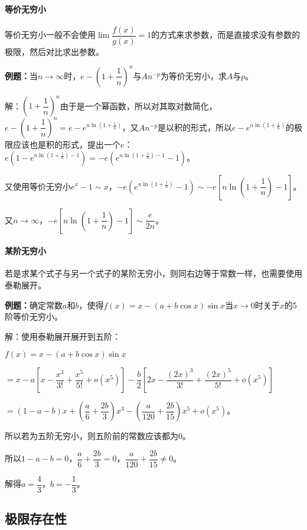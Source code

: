 \paragraph{等价无穷小} \leavevmode \medskip

等价无穷小一般不会使用$\lim\dfrac{f(x)}{g(x)}=1$的方式来求参数，而是直接求没有参数的极限，然后对比求出参数。

\textbf{例题：}当$n\to\infty$时，$e-\left(1+\dfrac{1}{n}\right)^n$与$An^{-p}$为等价无穷小，求$A$与$p$。

解：$\left(1+\dfrac{1}{n}\right)^n$由于是一个幂函数，所以对其取对数简化，$e-\left(1+\dfrac{1}{n}\right)^n=e-e^{n\ln(1+\frac{1}{n})}$，又$An^{-p}$是以积的形式，所以$e-e^{n\ln(1+\frac{1}{n})}$的极限应该也是积的形式，提出一个$e$：$e(1-e^{n\ln(1+\frac{1}{n})-1})=-e(e^{n\ln(1+\frac{1}{n})-1}-1)$。

又使用等价无穷小$e^x-1\sim x$，$-e(e^{n\ln(1+\frac{1}{n})}-1)\sim-e\left[n\ln\left(1+\dfrac{1}{n}\right)-1\right]$。

又$n\to\infty$，$-e\left[n\ln\left(1+\dfrac{1}{n}\right)-1\right]\sim\dfrac{e}{2n}$。

\paragraph{某阶无穷小} \leavevmode \medskip

若是求某个式子与另一个式子的某阶无穷小，则同右边等于常数一样，也需要使用泰勒展开。

\textbf{例题：}确定常数$a$和$b$，使得$f(x)=x-(a+b\cos x)\sin x$当$x\to 0$时关于$x$的5阶等价无穷小。

解：使用泰勒展开展开到五阶：

$f(x)=x-(a+b\cos x)\sin x$

$=x-a\left[x-\dfrac{x^3}{3!}+\dfrac{x^5}{5!}+o(x^5)\right]-\dfrac{b}{2}\left[2x-\dfrac{(2x)^3}{3!}+\dfrac{(2x)^5}{5!}+o(x^5)\right]$

$=(1-a-b)x+\left(\dfrac{a}{6}+\dfrac{2b}{3}\right)x^3-\left(\dfrac{a}{120}+\dfrac{2b}{15}\right)x^5+o(x^5)$。\medskip

所以若为五阶无穷小，则五阶前的常数应该都为0。

所以$1-a-b=0$，$\dfrac{a}{6}+\dfrac{2b}{3}=0$，$\dfrac{a}{120}+\dfrac{2b}{15}\neq0$。

解得$a=\dfrac{4}{3}$，$b=-\dfrac{1}{3}$。

\subsection{极限存在性}

